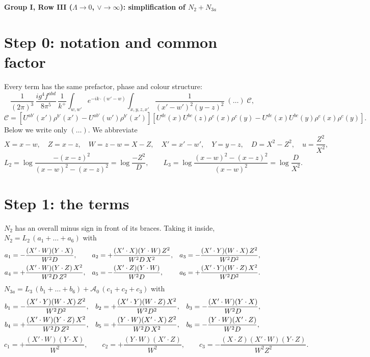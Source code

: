 \documentclass[10pt]{article}
\begin{document}
\begin{center}{\large\bf Group I, Row III ($\Lambda\to0$, $\vee\to\infty$): simplification of $N_{2}+N_{3a}$}\end{center}

\section*{Step 0: notation and common factor}
Every term has the same prefactor, phase and colour structure:
\begin{equation}
\frac{1}{(2\pi)^{3}}\,\frac{ig^{4}f^{abd}}{8\pi^{5}}\,\frac{1}{k^{+}}\int_{w,w'}e^{-ik\cdot(w'-w)}\int_{x,y,z,x'}\frac{1}{(x'-w')^{2}(y-z)^{2}}\;(\ldots)\;\mathcal C,
\end{equation}
\begin{equation}
\mathcal C=\left[U^{ab'}(x')\rho^{b'}(x')-U^{ab'}(w')\rho^{b'}(x')\right]\left[U^{de}(x)U^{bc}(z)\rho^{e}(x)\rho^{c}(y)-U^{de}(x)U^{bc}(y)\rho^{e}(x)\rho^{c}(y)\right].
\end{equation}
Below we write only $(\ldots)$. We abbreviate
\begin{equation}
X=x-w,\quad Z=x-z,\quad W=z-w=X-Z,\quad X'=x'-w',\quad Y=y-z,\quad D=X^{2}-Z^{2},\quad u=\frac{Z^{2}}{X^{2}},
\end{equation}
\begin{equation}
L_{2}=\log\frac{-(x-z)^{2}}{(x-w)^{2}-(x-z)^{2}}=\log\frac{-Z^{2}}{D},\qquad L_{3}=\log\frac{(x-w)^{2}-(x-z)^{2}}{(x-w)^{2}}=\log\frac{D}{X^{2}}.
\end{equation}

\section*{Step 1: the terms}
$N_{2}$ has an overall minus sign in front of its braces. Taking it inside, $N_{2}=L_{2}\,(a_{1}+\dots+a_{6})$ with
\begin{align}
a_{1}&=-\frac{(X'\cdot W)(Y\cdot X)}{W^{2}D}, &
a_{2}&=+\frac{(X'\cdot X)(Y\cdot W)\,Z^{2}}{W^{2}D\,X^{2}}, &
a_{3}&=-\frac{(X'\cdot Y)(W\cdot X)\,Z^{2}}{W^{2}D^{2}},\notag\\
a_{4}&=+\frac{(X'\cdot W)(Y\cdot Z)\,X^{2}}{W^{2}D\,Z^{2}}, &
a_{5}&=-\frac{(X'\cdot Z)(Y\cdot W)}{W^{2}D}, &
a_{6}&=+\frac{(X'\cdot Y)(W\cdot Z)\,X^{2}}{W^{2}D^{2}}.
\end{align}
$N_{3a}=L_{3}\,(b_{1}+\dots+b_{6})+\mathcal A_{0}\,(c_{1}+c_{2}+c_{3})$ with
\begin{align}
b_{1}&=-\frac{(X'\cdot Y)(W\cdot X)\,Z^{2}}{W^{2}D^{2}}, &
b_{2}&=+\frac{(X'\cdot Y)(W\cdot Z)\,X^{2}}{W^{2}D^{2}}, &
b_{3}&=-\frac{(X'\cdot W)(Y\cdot X)}{W^{2}D},\notag\\
b_{4}&=+\frac{(X'\cdot W)(Y\cdot Z)\,X^{2}}{W^{2}D\,Z^{2}}, &
b_{5}&=+\frac{(Y\cdot W)(X'\cdot X)\,Z^{2}}{W^{2}D\,X^{2}}, &
b_{6}&=-\frac{(Y\cdot W)(X'\cdot Z)}{W^{2}D},
\end{align}
\begin{equation}
c_{1}=+\frac{(X'\cdot W)(Y\cdot X)}{W^{2}},\qquad c_{2}=+\frac{(Y\cdot W)(X'\cdot Z)}{W^{2}},\qquad c_{3}=-\frac{(X\cdot Z)(X'\cdot W)(Y\cdot Z)}{W^{2}Z^{2}}.
\end{equation}
\end{document}
